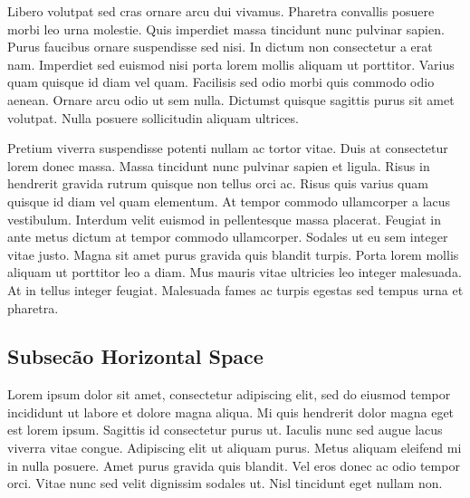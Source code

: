 \documentclass[12pt]{article}
\begin{document}
		Libero volutpat sed cras ornare arcu dui vivamus. Pharetra convallis posuere morbi leo urna molestie. Quis imperdiet massa tincidunt nunc pulvinar sapien. Purus faucibus ornare suspendisse sed nisi. In dictum non consectetur a erat nam. Imperdiet sed euismod nisi porta lorem mollis aliquam ut porttitor. Varius quam quisque id diam vel quam. Facilisis sed odio morbi quis commodo odio aenean. Ornare arcu odio ut sem nulla. Dictumst quisque sagittis purus sit amet volutpat. Nulla posuere sollicitudin aliquam ultrices.
			
		\begin{spacing}{0.5} %
			Pretium viverra suspendisse potenti nullam ac tortor vitae. Duis at consectetur lorem donec massa. Massa tincidunt nunc pulvinar sapien et ligula. Risus in hendrerit gravida rutrum quisque non tellus orci ac. Risus quis varius quam quisque id diam vel quam elementum. At tempor commodo ullamcorper a lacus vestibulum. Interdum velit euismod in pellentesque massa placerat. Feugiat in ante metus dictum at tempor commodo ullamcorper. Sodales ut eu sem integer vitae justo. Magna sit amet purus gravida quis blandit turpis. Porta lorem mollis aliquam ut porttitor leo a diam. Mus mauris vitae ultricies leo integer malesuada. At in tellus integer feugiat. Malesuada fames ac turpis egestas sed tempus urna et pharetra.
		\end{spacing}
		
		\singlespacing %
	\subsection{Subsecão Horizontal Space}
		\hspace{0cm}Lorem ipsum dolor sit amet, consectetur adipiscing elit, sed do eiusmod tempor incididunt ut labore et dolore magna aliqua. Mi quis hendrerit dolor magna eget est lorem ipsum. %
		\hspace{1cm}Sagittis id consectetur purus ut. Iaculis nunc sed augue lacus viverra vitae congue. Adipiscing elit ut aliquam purus. Metus aliquam eleifend mi in nulla posuere. 
		\hspace{2cm}Amet purus gravida quis blandit. Vel eros donec ac odio tempor orci. Vitae nunc sed velit dignissim sodales ut. Nisl tincidunt eget nullam non.
		
\end{document}

